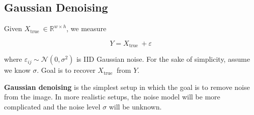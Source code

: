 \subsection{Gaussian Denoising}

\begin{definition}
    Given $X_{\text {true }} \in \mathbb{R}^{w \times h}$, we measure

    $$
    Y=X_{\text {true }}+\varepsilon
    $$

    where $\varepsilon_{i j} \sim \mathcal{N}\left(0, \sigma^{2}\right)$ is IID Gaussian noise. For the sake of simplicity, assume we know $\sigma$. Goal is to recover $X_{\text {true }}$ from $Y$.

    \textbf{Gaussian denoising} is the simplest setup in which the goal is to remove noise from the image. In more realistic setups, the noise model will be more complicated and the noise level $\sigma$ will be unknown.
\end{definition}

